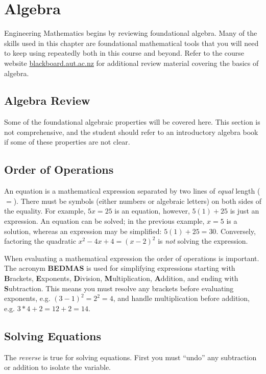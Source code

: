 \chapter{Algebra}
Engineering Mathematics begins by reviewing foundational algebra. Many of the skills used in this chapter are foundational mathematical tools that you will need to keep using repeatedly both in this course and beyond. Refer to the course website \url{blackboard.aut.ac.nz} for additional review material covering the basics of algebra.

\section{Algebra Review}\label{sec:introAlgebra}
Some of the foundational algebraic properties will be covered here. This section is not comprehensive, and the student should refer to an introductory algebra book if some of these properties are not clear.

\section*{Order of Operations}
An equation is a mathematical expression separated by two lines of \textit{equal} length ($=$). There must be symbols (either numbers or algebraic letters) on both sides of the equality. For example, $5x=25$ is an equation, however, $5(1)+25$ is just an expression. An equation can be solved; in the previous example, $x=5$ is a solution, whereas an expression may be simplified: $5(1)+25=30$. Conversely, factoring the quadratic $x^2-4x+4=(x-2)^2$ is \textit{not} solving the expression.

When evaluating a mathematical expression the order of operations is important. The acronym \textbf{BEDMAS} is used for simplifying expressions starting with \textbf{B}rackets, \textbf{E}xponents, \textbf{D}ivision, \textbf{M}ultiplication, \textbf{A}ddition, and ending with \textbf{S}ubtraction. This means you must resolve any brackets before evaluating exponents, e.g. $(3-1)^2=2^2=4$, and handle multiplication before addition, e.g. $3*4+2=12+2=14$.  
\section*{Solving Equations}
The \textit{reverse} is true for solving equations. First you must ``undo'' any subtraction or addition to isolate the variable.

